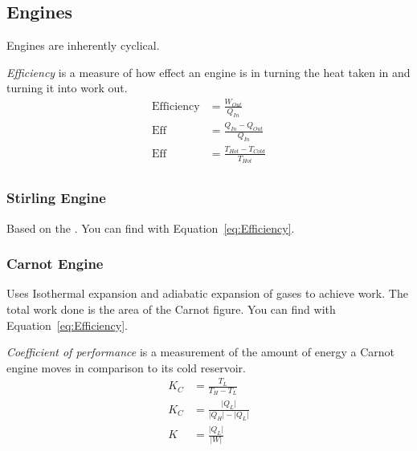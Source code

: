 	\subsection{Engines} \label{subsec:Engines}
	Engines are inherently cyclical.
		\begin{definition}[Efficiency] \label{def:Efficiency}
			\emph{Efficiency} is a measure of how effect an engine is in turning the heat taken in and turning it into work out.
			\begin{equation} \label{eq:Efficiency}
				\begin{aligned}
					\text{Efficiency} &= \frac{W_{Out}}{Q_{In}} \\
					\text{Eff} &= \frac{Q_{In}-Q_{Out}}{Q_{In}} \\
					\text{Eff} &= \frac{T_{Hot}-T_{Cold}}{T_{Hot}} \\
				\end{aligned}
			\end{equation}
		\end{definition}
	
		\subsubsection{Stirling Engine} \label{subsubsec:Stirling Engine}
		Based on the .
		You can find  with Equation~\eqref{eq:Efficiency}.
		
		\subsubsection{Carnot Engine} \label{subsubsec:Carnot Engine}
		Uses Isothermal expansion and adiabatic expansion of gases to achieve work.
		The total work done is the area of the Carnot figure.
		You can find  with Equation~\eqref{eq:Efficiency}.
		
			\begin{definition} \label{def:Coefficient of Performance}
				\emph{Coefficient of performance} is a measurement of the amount of energy a Carnot engine moves in comparison to its cold reservoir.
				\begin{equation} \label{eq:Coefficient of Performance}
					\begin{aligned}
						K_{C} &= \frac{T_{L}}{T_{H} - T_{L}} \\
						K_{C} &= \frac{\lvert Q_{L} \rvert}{\lvert Q_{H} \rvert - \lvert Q_{L} \rvert} \\
						K &= \frac{\lvert Q_{L} \rvert}{\lvert W \rvert} \\
					\end{aligned}
				\end{equation}
			\end{definition}
